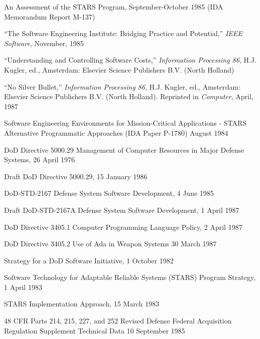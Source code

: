 \documentclass[11pt,final]{article}
\begin{document}
\begin{small}
\begin{description}[leftmargin=2in,style=sameline]
    \item [Bailey, Elizabeth, \textit{et al}] An Assessment of the STARS Program, September-October 1985 (IDA Memorandum Report M-137)

    \item [Barbacci, M.R. \textit{et al}] “The Software Engineering Institute: Bridging Practice
        and Potential,” \emph{IEEE Software}, November, 1985

    \item [Boehm, Barry W.] “Understanding and Controlling Software Costs,” \emph{Information Processing 86}, H.J. Kugler, ed., Amsterdam: Elsevier Science Publishers B.V. (North Holland)

    \item [Brocks, Frederick P.] “No Silver Bullet,” \emph{Information Processing 86}, H.J. Kugler, ed., Amsterdam: Elsevier Science Publishers B.V.  (North Holland). Reprinted in \emph{Computer}, April, 1987

    \item [DeMillo, Richard A., \textit{et al}] Software Engineering Environments for Mission-Critical Applications - STARS Alternative Programmatic Approaches (IDA Paper P-1780) August 1984

    \item [DoD]
        DoD Directive 5000.29 Management of Computer Resources in Major
        Defense Systems, 26 April 1976

        Draft DoD Directive 5000.29, 15 January
        1986

        DoD-STD-2167 Defense System Software Development, 4 June 1985

        Draft DoD-STD-2167A Defense System Software Development, 1 April 1987

        DoD Directive 3405.1 Computer Programming Language Policy, 2 April 1987

        DoD Directive 3405.2 Use of Ada in Weapon Systems 30 March 1987

        Strategy for a DoD Software Initiative, 1 October 1982

        Software Technology for Adaptable Reliable Systems (STARS) Program Strategy, 1
        April 1983

        STARS Implementation Approach, 15 March 1983

        48 CFR Parts 214, 215, 227, and 252 Revised Defense Federal Acquisition Regulation
        Supplement Technical Data 10 September 1985


\end{description}
\end{small}
\end{document}
